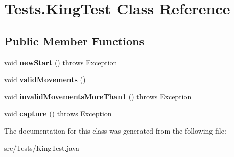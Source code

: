 \hypertarget{class_tests_1_1_king_test}{}\section{Tests.\+King\+Test Class Reference}
\label{class_tests_1_1_king_test}
\subsection*{Public Member Functions}
\begin{DoxyCompactItemize}
\item 
\mbox{\label{class_tests_1_1_king_test_a88b383cdf430afd0b43d98c67594938b}} 
void {\bfseries new\+Start} ()  throws Exception
\item 
\mbox{\label{class_tests_1_1_king_test_af1d0fa8df3379993293e247e99f6fba7}} 
void {\bfseries valid\+Movements} ()
\item 
\mbox{\label{class_tests_1_1_king_test_abefaadc68b4e1eeada87321158799eb9}} 
void {\bfseries invalid\+Movements\+More\+Than1} ()  throws Exception 
\item 
\mbox{\label{class_tests_1_1_king_test_ae12f7a13c2cb9cd21987e92fe4c364c8}} 
void {\bfseries capture} ()  throws Exception 
\end{DoxyCompactItemize}


The documentation for this class was generated from the following file\+:\begin{DoxyCompactItemize}
\item 
src/\+Tests/King\+Test.\+java\end{DoxyCompactItemize}

